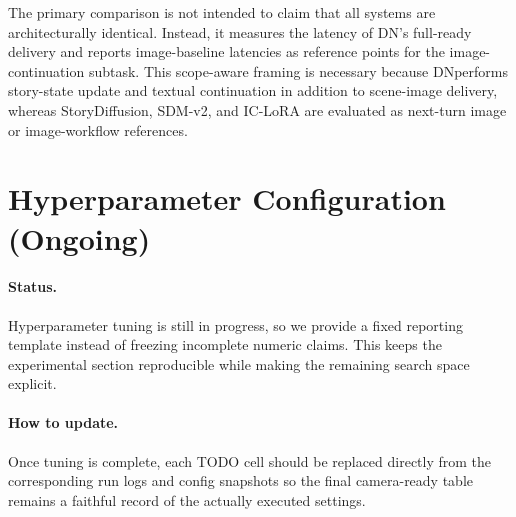 ﻿\documentclass[11pt]{article}
\newcommand{\dn}{\textsc{DN}}
\begin{document}
The primary comparison is not intended to claim that all systems are architecturally identical. Instead, it measures the latency of \dn's full-ready delivery and reports image-baseline latencies as reference points for the image-continuation subtask. This scope-aware framing is necessary because \dn performs story-state update and textual continuation in addition to scene-image delivery, whereas StoryDiffusion, SDM-v2, and IC-LoRA are evaluated as next-turn image or image-workflow references.


\section{Hyperparameter Configuration (Ongoing)}
\label{sec:hyperparams}

\paragraph{Status.}
Hyperparameter tuning is still in progress, so we provide a fixed reporting template instead of freezing incomplete numeric claims. This keeps the experimental section reproducible while making the remaining search space explicit.

\begin{table}[t]
\centering
\small
{}
\caption{Hyperparameter table template (ongoing). Pending artifact path: \texttt{[PATH\_TO\_HYPERPARAM\_LOGS]}.}
\label{tab:hyperparams-template}
\end{table}

\paragraph{How to update.}
Once tuning is complete, each TODO cell should be replaced directly from the corresponding run logs and config snapshots so the final camera-ready table remains a faithful record of the actually executed settings.
\end{document}
